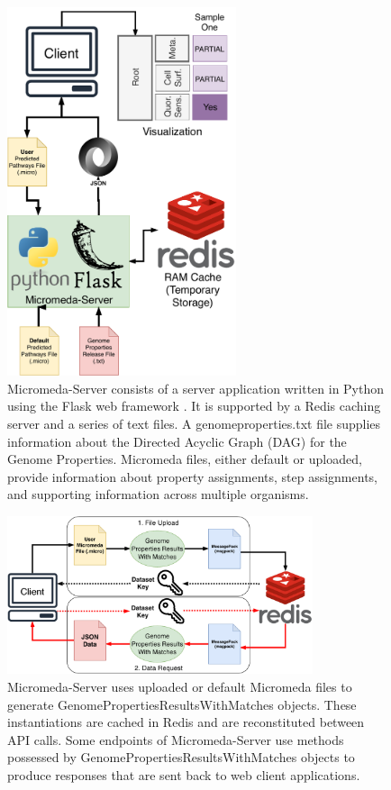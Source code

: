 \begin{figure}[!ht]
  \centering
	\includegraphics[width=0.60\textwidth]{media/Micromeda-Server.pdf}
	 \caption{Micromeda-Server consists of a server application written in Python using the Flask web framework \cite{grinberg2018flask}. It is supported by a Redis caching server and a series of text files. A genomeproperties.txt file supplies information about the Directed Acyclic Graph (DAG) for the Genome Properties. Micromeda files, either default or uploaded, provide information about property assignments, step assignments, and supporting information across multiple organisms.}
	 \label{fig:micromeda-server}
\end{figure}

\begin{figure}[!ht]
  \centering
	\includegraphics[width=0.80\textwidth]{media/Micromeda-Server-Workflow.pdf}
	 \caption{Micromeda-Server uses uploaded or default Micromeda files to generate GenomePropertiesResultsWithMatches objects. These instantiations are cached in Redis and are reconstituted between API calls. Some endpoints of Micromeda-Server use methods possessed by GenomePropertiesResultsWithMatches objects to produce responses that are sent back to web client applications.}
	 \label{fig:micromeda-server-workflow}
\end{figure}

